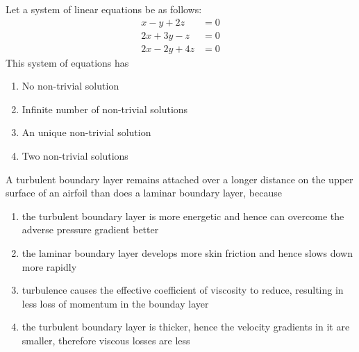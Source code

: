 		
	\item Let a system of linear equations be as follows:
		\begin{align*}
			x - y + 2z &= 0\\
			2x + 3y - z &= 0\\
			2x-2y+4z &=0
		\end{align*}
		This system of equations has

		\begin{enumerate}
			\item No non-trivial solution
			\item Infinite number of non-trivial solutions
			\item An unique non-trivial solution
			\item Two non-trivial solutions
		\end{enumerate}

	\item A turbulent boundary layer remains attached over a longer distance on the upper surface of an airfoil than does a laminar boundary layer, because
		\begin{enumerate}
			\item the turbulent boundary layer is more energetic and hence can overcome the adverse pressure gradient better
			\item the laminar boundary layer develops more skin friction and hence slows down more rapidly
			\item turbulence causes the effective coefficient of viscosity to reduce, resulting in less loss of momentum in the bounday layer
			\item the turbulent boundary layer is thicker, hence the velocity gradients in it are smaller, therefore viscous losses are less
		\end{enumerate}




